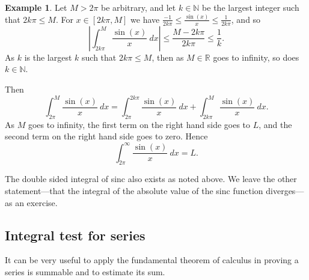 \documentclass[12pt]{book}
\newcommand{\abs}[1]{\left\lvert {#1} \right\rvert}
\newcommand{\R}{{\mathbb{R}}}
\newcommand{\N}{{\mathbb{N}}}
\theoremstyle{plain}
\theoremstyle{remark}
\theoremstyle{definition}
\theoremstyle{exercise}
\theoremstyle{example}
\newtheorem{example}[thm]{Example}
\begin{document}
\begin{example}
Let $M > 2\pi$ be arbitrary, and let $k \in \N$
be the largest integer such that $2k\pi \leq M$.
For $x \in [2k\pi,M]$ we have 
$\frac{-1}{2k\pi} \leq \frac{\sin(x)}{x} \leq \frac{1}{2k\pi}$, and so
\begin{equation*}
\abs{\int_{2k\pi}^{M} \frac{\sin(x)}{x} ~dx }  \leq
\frac{M-2k\pi}{2k\pi} \leq \frac{1}{k} .
\end{equation*}
As $k$ is the largest $k$ such that $2k\pi \leq M$,
then as $M\in \R$ goes to infinity, so does $k \in \N$.

Then
\begin{equation*}
\int_{2\pi}^M \frac{\sin(x)}{x}~dx
=
\int_{2\pi}^{2k\pi} \frac{\sin(x)}{x} ~dx
+
\int_{2k\pi}^{M} \frac{\sin(x)}{x} ~dx .
\end{equation*}
As $M$ goes to infinity,
the first term on the
right hand side goes to $L$,
and the second term on the
right hand side
goes to zero.  Hence
\begin{equation*}
\int_{2\pi}^\infty \frac{\sin(x)}{x} ~dx = L .
\end{equation*}

The double sided integral of sinc also exists as noted above.
We leave the other statement---that the integral
of the absolute value of the sinc function diverges---as an exercise.
\end{example}

\subsection{Integral test for series}

It can be very useful to apply the fundamental theorem 
of calculus in proving a series is summable and to estimate its sum.
\end{document}

